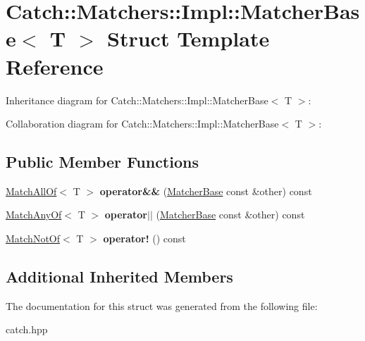\hypertarget{structCatch_1_1Matchers_1_1Impl_1_1MatcherBase}{}\section{Catch\+:\+:Matchers\+:\+:Impl\+:\+:Matcher\+Base$<$ T $>$ Struct Template Reference}
\label{structCatch_1_1Matchers_1_1Impl_1_1MatcherBase}


Inheritance diagram for Catch\+:\+:Matchers\+:\+:Impl\+:\+:Matcher\+Base$<$ T $>$\+:


Collaboration diagram for Catch\+:\+:Matchers\+:\+:Impl\+:\+:Matcher\+Base$<$ T $>$\+:
\subsection*{Public Member Functions}
\begin{DoxyCompactItemize}
\item 
\hyperlink{structCatch_1_1Matchers_1_1Impl_1_1MatchAllOf}{Match\+All\+Of}$<$ T $>$ {\bfseries operator\&\&} (\hyperlink{structCatch_1_1Matchers_1_1Impl_1_1MatcherBase}{Matcher\+Base} const \&other) const \hypertarget{structCatch_1_1Matchers_1_1Impl_1_1MatcherBase_a275a18e3e1c4d0bddfde34e362f66b6c}{}\label{structCatch_1_1Matchers_1_1Impl_1_1MatcherBase_a275a18e3e1c4d0bddfde34e362f66b6c}

\item 
\hyperlink{structCatch_1_1Matchers_1_1Impl_1_1MatchAnyOf}{Match\+Any\+Of}$<$ T $>$ {\bfseries operator$\vert$$\vert$} (\hyperlink{structCatch_1_1Matchers_1_1Impl_1_1MatcherBase}{Matcher\+Base} const \&other) const \hypertarget{structCatch_1_1Matchers_1_1Impl_1_1MatcherBase_a382ffd0d07d6a5cdadd2bd36ade0a742}{}\label{structCatch_1_1Matchers_1_1Impl_1_1MatcherBase_a382ffd0d07d6a5cdadd2bd36ade0a742}

\item 
\hyperlink{structCatch_1_1Matchers_1_1Impl_1_1MatchNotOf}{Match\+Not\+Of}$<$ T $>$ {\bfseries operator!} () const \hypertarget{structCatch_1_1Matchers_1_1Impl_1_1MatcherBase_afd5c25339eab93d9ea037fa4282fca7c}{}\label{structCatch_1_1Matchers_1_1Impl_1_1MatcherBase_afd5c25339eab93d9ea037fa4282fca7c}

\end{DoxyCompactItemize}
\subsection*{Additional Inherited Members}


The documentation for this struct was generated from the following file\+:\begin{DoxyCompactItemize}
\item 
catch.\+hpp\end{DoxyCompactItemize}
